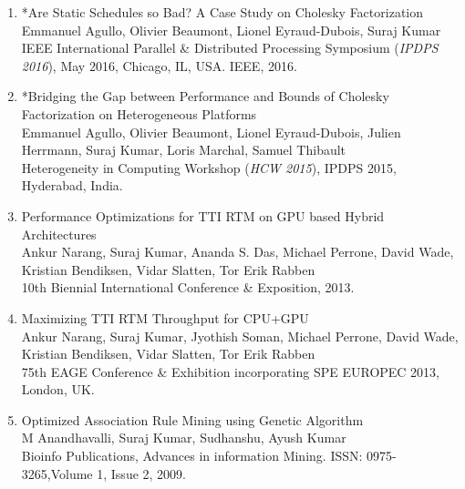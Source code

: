 \documentclass[letterpaper,11pt]{article}
\newcommand{\resheading}[1]{{\large \colorbox{mygrey}{\begin{minipage}{\textwidth}{\textbf{#1 \vphantom{p\^{E}}}}\end{minipage}}}}
\begin{document}
\begin{enumerate}
	\item *Are Static Schedules so Bad? A Case Study on Cholesky Factorization\\
	Emmanuel Agullo, Olivier Beaumont, Lionel Eyraud-Dubois, Suraj Kumar\\
	IEEE International Parallel \& Distributed Processing Symposium (\textit{IPDPS 2016}), May 2016, Chicago, IL, USA. IEEE, 2016.
	\item {*Bridging the Gap between Performance and Bounds of Cholesky Factorization on Heterogeneous Platforms\\
		Emmanuel Agullo, Olivier Beaumont, Lionel Eyraud-Dubois, Julien Herrmann, Suraj Kumar, Loris Marchal, Samuel Thibault\\
		Heterogeneity in Computing Workshop (\textit{HCW 2015}), IPDPS 2015, Hyderabad, India.}
	\item {Performance Optimizations for TTI RTM on GPU based Hybrid Architectures\\
		Ankur Narang, Suraj Kumar, Ananda S. Das, Michael Perrone, David Wade, Kristian Bendiksen, Vidar Slatten, Tor Erik Rabben\\
		10th Biennial International Conference \& Exposition, 2013.}
	\item
	{ Maximizing TTI RTM Throughput for CPU+GPU\\
		Ankur Narang, Suraj Kumar, Jyothish Soman, Michael Perrone, David Wade, Kristian Bendiksen, Vidar Slatten, Tor Erik Rabben\\
		75th EAGE Conference \& Exhibition incorporating SPE EUROPEC 2013, London, UK.}
	
	\item 
	{ Optimized Association Rule Mining using Genetic Algorithm \\
		M Anandhavalli, Suraj Kumar, Sudhanshu, Ayush Kumar \\
		Bioinfo Publications, Advances in information Mining. ISSN: 0975-3265,Volume 1, Issue  2, 2009.}
	
\end{enumerate}

%
\end{document}
